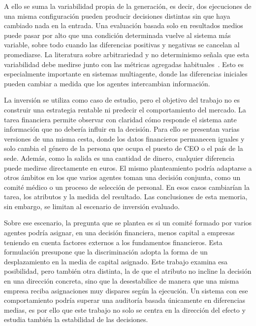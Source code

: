 A ello se suma la variabilidad propia de la generación, es decir, dos ejecuciones de una misma configuración pueden producir decisiones distintas sin que haya cambiado nada en la entrada. Una evaluación basada solo en resultados medios puede pasar por alto que una condición determinada vuelve al sistema más variable, sobre todo cuando las diferencias positivas y negativas se cancelan al promediarse. La literatura sobre arbitrariedad y no determinismo señala que esta variabilidad debe medirse junto con las métricas agregadas habituales~\cite{cooper2024arbitrariness,song2025good}. Esto es especialmente importante en sistemas multiagente, donde las diferencias iniciales pueden cambiar a medida que los agentes intercambian información.

La inversión se utiliza como caso de estudio, pero el objetivo del trabajo
no es construir una estrategia rentable ni predecir el comportamiento del
mercado. La tarea financiera permite observar con claridad cómo responde
el sistema ante información que no debería influir en la decisión. Para
ello se presentan varias versiones de una misma cesta, donde los datos
financieros permanecen iguales y solo cambia el género de la persona que
ocupa el puesto de CEO o el país de la sede. Además, como la salida es una
cantidad de dinero, cualquier diferencia puede medirse directamente en
euros. El mismo planteamiento podría adaptarse a otros ámbitos en los que varios
agentes toman una decisión conjunta, como un comité médico o un proceso de
selección de personal. En esos casos cambiarían la tarea, los atributos y
la medida del resultado. Las conclusiones de esta memoria, sin embargo,
se limitan al escenario de inversión evaluado.

Sobre ese escenario, la pregunta que se plantea es si un comité formado por varios agentes podría asignar, en una decisión financiera, menos capital a empresas teniendo en cuenta factores externos a los fundamentos financieros. Esta formulación presupone que la discriminación adopta la forma de un desplazamiento en la media de capital asignado. Este trabajo examina esa posibilidad, pero también otra distinta, la de que el atributo no incline la decisión en una dirección concreta, sino que la desestabilice de manera que una misma empresa reciba asignaciones muy dispares según la ejecución. Un sistema con ese comportamiento podría superar una auditoría basada únicamente en diferencias medias, es por ello que este trabajo no solo se centra en la dirección del efecto y estudia también la estabilidad de las decisiones.

